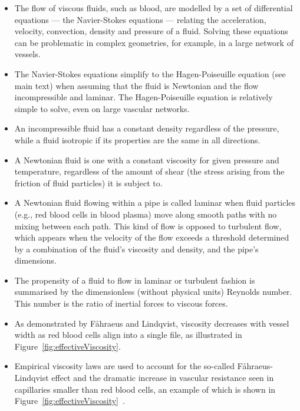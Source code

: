 \documentclass{article}
\begin{document}
\begin{tcolorbox}[title=Additional information -- Fluid flow modelling]
  \begin{itemize}
  \item The flow of viscous fluids, such as blood, are modelled by a set of differential equations --- the Navier-Stokes equations --- relating the acceleration, velocity, convection, density and pressure of a fluid.
    Solving these equations can be problematic in complex geometries, for example, in a large network of vessels.
  \item The Navier-Stokes equations simplify to the Hagen-Poiseuille equation (see main text) when assuming that the fluid is Newtonian and the flow incompressible and laminar.
    The Hagen-Poiseuille equation is relatively simple to solve, even on large vascular networks.
  \item An incompressible fluid has a constant density regardless of the pressure, while a fluid isotropic if its properties are the same in all directions.
  \item A Newtonian fluid is one with a constant viscosity for given pressure and temperature, regardless of the amount of shear (the stress arising from the friction of fluid particles) it is subject to.
  \item A Newtonian fluid flowing within a pipe is called laminar when fluid particles (e.g., red blood cells in blood plasma) move along smooth paths with no mixing between each path.
    This kind of flow is opposed to turbulent flow, which appears when the velocity of the flow exceeds a threshold determined by a combination of the fluid's viscosity and density, and the pipe's dimensions.
  \item The propensity of a fluid to flow in laminar or turbulent fashion is summarised by the dimensionless (without physical units) Reynolds number. This number is the ratio of inertial forces to viscous forces.
  \item As demonstrated by F\r ahraeus and Lindqvist, viscosity decreases with vessel width as red blood cells align into a single file, as illustrated in Figure~\ref{fig:effectiveViscosity}\cite{Faahraeus_1931}.
  \item Empirical viscosity laws are used to account for the so-called F\r ahraeus-Lindqvist effect and the dramatic increase in vascular resistance seen in capillaries smaller than red blood cells, an example of which is shown in Figure~\ref{fig:effectiveViscosity}~\cite{Haynes_1960,Pries_1990,Secomb_2013}.
  \end{itemize}
\end{tcolorbox}
\end{document}
